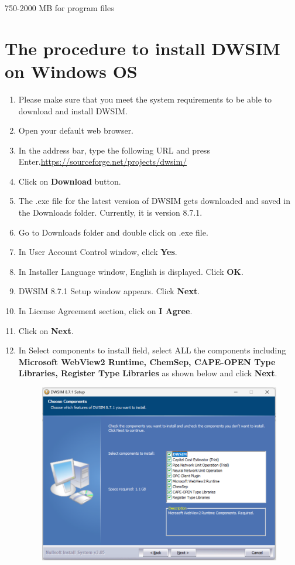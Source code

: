 \documentclass[a4paper,12pt]{article}
\begin{document}
750-2000 MB for program files

\section{The procedure to install DWSIM on Windows OS}

\begin{enumerate}
\item Please make sure that you meet the system requirements to be able to download and install DWSIM.
\item Open your default web browser.
\item In the address bar, type the following URL and press Enter.\newline \url{https://sourceforge.net/projects/dwsim/}
\item Click on \textbf{Download} button.
\item The .exe file for the latest version of DWSIM gets downloaded and saved in the Downloads folder. Currently, it is version 8.7.1.
\item Go to Downloads folder and double click on .exe file.
\item In User Account Control window, click \textbf{Yes}.
\item In Installer Language window, English is displayed. Click \textbf{OK}.
\item DWSIM 8.7.1 Setup window appears. Click \textbf{Next}.
\item In License Agreement section, click on \textbf{I Agree}.
\item Click on \textbf{Next}.
\item In Select components to install field, select ALL the components including \textbf{Microsoft WebView2 Runtime, ChemSep, CAPE-OPEN Type Libraries, Register Type Libraries} as shown below and click \textbf{Next}.

\begin{figure}[H]
	\centering
	\includegraphics[width=0.75\linewidth]{DWSIM-Components.png}
\end{figure}


\end{enumerate}
\end{document}
